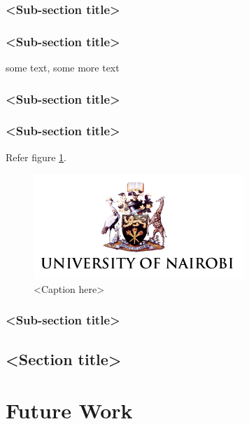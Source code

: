\documentclass[12pt,a4paper]{report}
\begin{document}
\subsection{<Sub-section title>}

\subsection{<Sub-section title>}
some text\cite{citation-2-name-here}, some more text
\subsection{<Sub-section title>}

\subsection{<Sub-section title>}

Refer figure \ref{fig:label}.

\begin{figure}[htb]
\centering
\includegraphics[scale=0.3]{glider} %
\caption{<Caption here>}
\label{fig:label} %
\end{figure}

\subsection{<Sub-section title>}


\section{<Section title>}


\chapter{Future Work}
\end{document}
